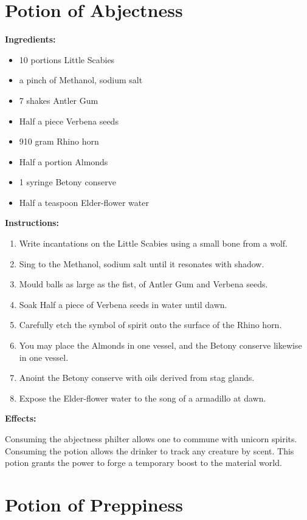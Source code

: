 \documentclass{article}
\begin{document}
\newpage
\section*{Potion of Abjectness}

\textbf{Ingredients:}

\begin{itemize}
  \item 10 portions Little Scabies
  \item a pinch of Methanol, sodium salt
  \item 7 shakes Antler Gum
  \item Half a piece Verbena seeds
  \item 910 gram Rhino horn
  \item Half a portion Almonds
  \item 1 syringe Betony conserve
  \item Half a teaspoon Elder-flower water
\end{itemize}

\textbf{Instructions:}

\begin{enumerate}
  \item Write incantations on the Little Scabies using a small bone from a wolf.
  \item Sing to the Methanol, sodium salt until it resonates with shadow.
  \item Mould balls as large as the fist, of Antler Gum and Verbena seeds.
  \item Soak Half a piece of Verbena seeds in water until dawn.
  \item Carefully etch the symbol of spirit onto the surface of the Rhino horn.
  \item You may place the Almonds in one vessel, and the Betony conserve likewise in one vessel.
  \item Anoint the Betony conserve with oils derived from stag glands.
  \item Expose the Elder-flower water to the song of a armadillo at dawn.
\end{enumerate}

\textbf{Effects:}

Consuming the abjectness philter allows one to commune with unicorn spirits. Consuming the potion allows the drinker to track any creature by scent. This potion grants the power to forge a temporary boost to the material world.

\newpage
\section*{Potion of Preppiness}
\end{document}
